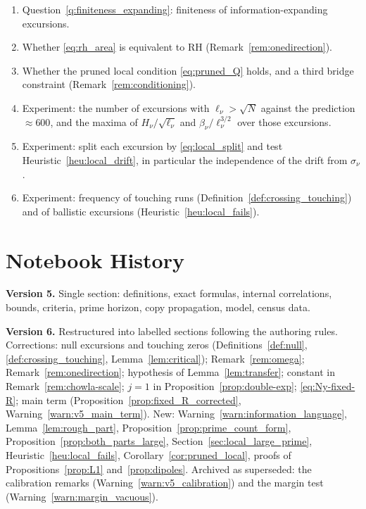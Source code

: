 \documentclass[11pt]{amsart}
\numberwithin{equation}{section}
\theoremstyle{plain}
\theoremstyle{definition}
\theoremstyle{remark}
\begin{document}
\begin{enumerate}[label=\textup{(\arabic*)}]
\item Question~\ref{q:finiteness_expanding}: finiteness of
information-expanding excursions.
\item Whether \eqref{eq:rh_area} is equivalent to RH
(Remark~\ref{rem:onedirection}).
\item Whether the pruned local condition \eqref{eq:pruned_Q} holds, and a
third bridge constraint (Remark~\ref{rem:conditioning}).
\item Experiment: the number of excursions with $\ell_\nu>\sqrt N$ against the
prediction $\approx600$, and the maxima of $H_\nu/\sqrt{\ell_\nu}$ and
$\beta_\nu/\ell_\nu^{3/2}$ over those excursions.
\item Experiment: split each excursion by \eqref{eq:local_split} and test
Heuristic~\ref{heu:local_drift}, in particular the independence of the drift
from $\sigma_\nu$.
\item Experiment: frequency of touching runs (Definition~\ref{def:crossing_touching})
and of ballistic excursions (Heuristic~\ref{heu:local_fails}).
\end{enumerate}

\section*{Notebook History}
\label{sec:history}

\noindent\textbf{Version 5.} Single section: definitions, exact formulas,
internal correlations, bounds, criteria, prime horizon, copy propagation,
model, census data.

\medskip
\noindent\textbf{Version 6.} Restructured into labelled sections following
the authoring rules. Corrections: null excursions and touching zeros
(Definitions~\ref{def:null}, \ref{def:crossing_touching},
Lemma~\ref{lem:critical}); Remark~\ref{rem:omega};
Remark~\ref{rem:onedirection}; hypothesis of Lemma~\ref{lem:transfer};
constant in Remark~\ref{rem:chowla-scale}; $j=1$ in
Proposition~\ref{prop:double-exp}; \eqref{eq:Ny-fixed-R}; main term
(Proposition~\ref{prop:fixed_R_corrected}, Warning~\ref{warn:v5_main_term}).
New: Warning~\ref{warn:information_language}, Lemma~\ref{lem:rough_part},
Proposition~\ref{prop:prime_count_form},
Proposition~\ref{prop:both_parts_large},
Section~\ref{sec:local_large_prime}, Heuristic~\ref{heu:local_fails},
Corollary~\ref{cor:pruned_local}, proofs of
Propositions~\ref{prop:L1} and~\ref{prop:dipoles}. Archived as superseded:
the calibration remarks (Warning~\ref{warn:v5_calibration}) and the margin
test (Warning~\ref{warn:margin_vacuous}).
\end{document}
